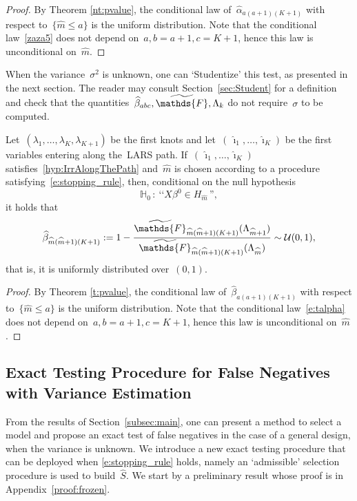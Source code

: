 \documentclass[final,numbib]{imaiai}%
\numberwithin{equation}{section}
\def\cU{\mathcal{U}}
\def\bbF{\mathds{F}}
\renewcommand{\hat}{\widehat}
\renewcommand{\tilde}{\widetilde}
\newcommand{\<}{\langle}
\renewcommand{\>}{\rangle}
\newcommand{\1}{\mathds{1}}
\begin{document}
{\pagebreak[3]

\begin{proof}
By Theorem \ref{nt:pvalue}, the conditional law of~$\hat\alpha_{a(a+1)(K+1)}$ with respect to~$\{\hat m\leq a\}$ is the uniform distribution.
Note that the conditional law~\eqref{zaza5} does not depend on~$a,b=a+1,c=K+1$, hence this law is unconditional on~$\hat m$.
\end{proof}

\noindent
When the variance~$\sigma^2$ is unknown, one can `Studentize' this test, as presented in the next section.
The reader may consult Section~\ref{sec:Student} for a definition and check that the quantities~$\hat\beta_{abc},\tilde\bbF,\Lambda_k$ do not require~$\sigma$ to be computed.

\begin{corollary}
\label{prop:unconditional_t_test}
Let~$(\lambda_1,\ldots, \lambda_K,\lambda_{K+1})$ be the first knots and let~$(\,\hat \imath_1,\ldots, \hat \imath_K)$ be the first variables entering along the~LARS path.
If~$(\,\hat \imath_1,\ldots, \hat \imath_K)$ satisfies~\eqref{hyp:IrrAlongThePath} and~$\hat m$ is chosen according to a procedure satisfying~{\eqref{e:stopping_rule}}, then, conditional on the null hypothesis
\[
\mathds H_0\,:\ \text{‘‘}X\beta^0\in H_{\hat m}\,\text{''},
\] 
it holds that
\[
\hat\beta_{\hat m(\hat m+1)(K+1)}:=1
-\frac{\tilde\bbF_{\hat m(\hat m+1)(K+1)}(\Lambda_{\hat m+1})}{\tilde\bbF_{\hat m(\hat m+1)(K+1)}(\Lambda_{\hat m})}
\sim\cU(0,1),
\]
that is, it is uniformly distributed over~$(0,1)$.
\end{corollary}

\begin{proof}
By Theorem \ref{t:pvalue}, the conditional law of~$\hat\beta_{a(a+1)(K+1)}$ with respect to~$\{\hat m\leq a\}$ is the uniform distribution. Note that the conditional law~\eqref{e:talpha} does not depend on~$a,b=a+1,c=K+1$, hence this law is unconditional on~$\hat m$.
\end{proof}

\subsection{Exact Testing Procedure for False Negatives with Variance Estimation}
\label{sec:FalseNeg}\label{sec:Student}

From the results of Section~\ref{subsec:main}, one can present a method to select a model and propose an exact test of false negatives in the case of a general design, when the variance is unknown.
We introduce a new exact testing procedure that can be deployed when {\eqref{e:stopping_rule}} holds, namely an `admissible' selection procedure is used to build~$\hat S$. We start by a preliminary result whose proof is in Appendix~\ref{proof:frozen}.
 
}
\end{document}
